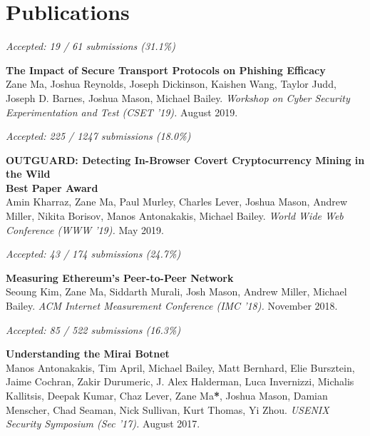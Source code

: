 \documentclass[10pt]{article} %
\begin{document}
{\begin{minipage}[t]{0.5\textwidth}
\section{Publications} 


\vspace{4pt}

{\raggedleft\textit{Accepted: 19 / 61 submissions (31.1\%)}\par}

\textbf{The Impact of Secure Transport Protocols on Phishing Efficacy}\\
Zane Ma, Joshua Reynolds, Joseph Dickinson, Kaishen Wang, Taylor Judd, Joseph D. Barnes, Joshua Mason, Michael Bailey.
\textit{Workshop on Cyber Security Experimentation and Test (CSET '19).} August 2019.


{\raggedleft\textit{Accepted: 225 / 1247 submissions (18.0\%)}\par}

\textbf{OUTGUARD: Detecting In-Browser Covert Cryptocurrency Mining in the Wild}\\
    \textbf{\color{headings}Best Paper Award}\\
Amin Kharraz, Zane Ma, Paul Murley, Charles Lever, Joshua Mason, Andrew Miller,
Nikita Borisov, Manos Antonakakis, Michael Bailey. 
\textit{World Wide Web Conference (WWW '19).} May 2019.


{\raggedleft\textit{Accepted: 43 / 174 submissions (24.7\%)}\par}

\textbf{Measuring Ethereum's Peer-to-Peer Network}\\
Seoung Kim, Zane Ma, Siddarth Murali, Josh Mason, Andrew Miller, Michael Bailey.
\textit{ACM Internet Measurement Conference (IMC '18).} November 2018.


\vspace{6pt}
{\raggedleft\textit{Accepted: 85 / 522 submissions (16.3\%)}\par}

\textbf{Understanding the Mirai Botnet}\\
Manos Antonakakis, Tim April, Michael Bailey, Matt Bernhard, Elie Bursztein, Jaime Cochran, Zakir Durumeric, J. Alex Halderman, Luca Invernizzi, Michalis Kallitsis, Deepak Kumar, Chaz Lever, Zane Ma\textbf{*}, Joshua Mason, Damian Menscher, Chad Seaman, Nick Sullivan, Kurt Thomas, Yi Zhou.
\textit{USENIX Security Symposium (Sec '17).} August 2017.


\end{minipage}}
\end{document}
